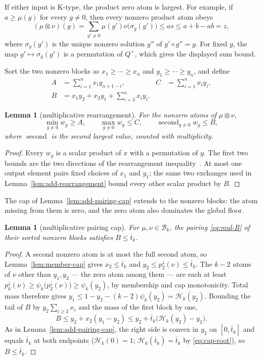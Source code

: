 \documentclass[11pt]{article}
\newtheorem{lemma}[theorem]{Lemma}
\theoremstyle{definition}
\theoremstyle{remark}
\newcommand{\body}{\mathcal{B}}
\newcommand{\down}{\downarrow}
\begin{document}
If either input is K-type, the product zero atom is largest.  For example,
if $a\ge\mu(g)$ for every $g\ne0$, then every nonzero product atom obeys
\[
 (\mu\otimes\nu)(g)
 =\sum_{g'\ne0}\mu(g')\nu\bigl(\sigma_g(g')\bigr)
 \le as\le a+b-ab=z,
\]
where $\sigma_g(g')$ is the unique nonzero solution $g''$ of
$g'\diamond g''=g$.  For fixed $g$, the map $g'\mapsto\sigma_g(g')$ is a
permutation of $Q^\times$, which gives the displayed sum bound.

Sort the two nonzero blocks as $x_1\ge\cdots\ge x_n$ and
$y_1\ge\cdots\ge y_n$, and define
\begin{align}
 A&=\sum_{i=1}^n x_i y_{n+1-i},
 &C&=\sum_{i=1}^n x_i y_i,\label{eq:mul-AC}\\
 B&=x_1y_2+x_2y_1+\sum_{i=3}^n x_i y_i.\label{eq:mul-B}
\end{align}

\begin{lemma}[multiplicative rearrangement]\label{lem:mul-rearrangement}
For the nonzero atoms of $\mu\otimes\nu$,
\[
 \min_{g\ne0}w_g\ge A,\qquad
 \max_{g\ne0}w_g\le C,
 \qquad
 \operatorname{second}_{g\ne0}w_g\le B,
\]
where $\operatorname{second}$ is the second largest value, counted with
multiplicity.
\end{lemma}

\begin{proof}
Every $w_g$ is a scalar product of $x$ with a permutation of $y$.  The
first two bounds are the two directions of the rearrangement
inequality~\cite[Theorem~368]{hardy1952}.
At most one output element pairs fixed choices of $x_1$ and $y_1$; the same two
exchanges used in Lemma~\ref{lem:add-rearrangement} bound every other scalar
product by $B$.
\end{proof}

The cap of Lemma~\ref{lem:add-pairing-cap} extends to the nonzero
blocks: the atom missing from them is zero, and the zero atom also
dominates the global floor.

\begin{lemma}[multiplicative pairing cap]\label{lem:mul-pairing-cap}
For $\mu,\nu\in\body_k$, the pairing \eqref{eq:mul-B} of their sorted
nonzero blocks satisfies $B\le\bar t_k$.
\end{lemma}

\begin{proof}
A second nonzero atom is at most the full second atom, so
Lemma~\ref{lem:member-cap} gives $x_2\le\bar t_k$ and
$y_2\le p_2^\down(\nu)\le\bar t_k$.  The $k-2$ atoms of $\nu$ other than
$y_1,y_2$ --- the zero atom among them --- are each at least
$p_k^\down(\nu)\ge\psi_k\bigl(p_2^\down(\nu)\bigr)\ge\psi_k(y_2)$, by
membership and cap monotonicity.  Total mass therefore gives
$y_1\le1-y_2-(k-2)\psi_k(y_2)=\mathcal H_k(y_2)$.  Bounding the tail of
$B$ by $y_2\sum_{i\ge3}x_i$ and the mass of the first block by one,
\[
 B\le y_2+x_2(y_1-y_2)
 \le y_2+\bar t_k\bigl(\mathcal H_k(y_2)-y_2\bigr).
\]
As in Lemma~\ref{lem:add-pairing-cap}, the right side is convex in
$y_2$ on $[0,\bar t_k]$ and equals $\bar t_k$ at both endpoints
($\mathcal H_k(0)=1$; $\mathcal H_k(\bar t_k)=\bar t_k$ by
\eqref{eq:cap-root}), so $B\le\bar t_k$.
\end{proof}
\end{document}
